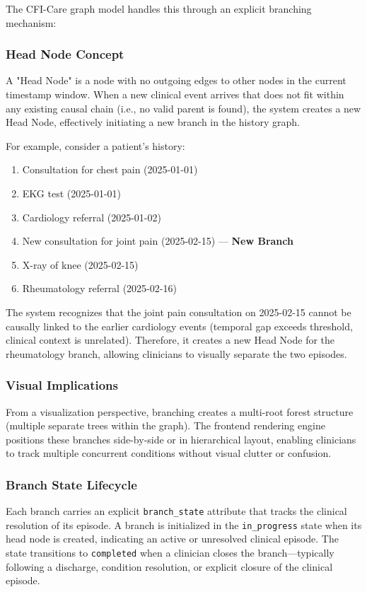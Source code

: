 The CFI-Care graph model handles this through an explicit branching mechanism:

\subsubsection{Head Node Concept}
A "Head Node" is a node with no outgoing edges to other nodes in the current
timestamp window. When a new clinical event arrives that does not fit within
any existing causal chain (i.e., no valid parent is found), the system creates
a new Head Node, effectively initiating a new branch in the history graph.

For example, consider a patient's history:
\begin{enumerate}
    \item Consultation for chest pain (2025-01-01)
    \item EKG test (2025-01-01)
    \item Cardiology referral (2025-01-02)
    \item New consultation for joint pain (2025-02-15) — \textbf{New Branch}
    \item X-ray of knee (2025-02-15)
    \item Rheumatology referral (2025-02-16)
\end{enumerate}

The system recognizes that the joint pain consultation on 2025-02-15 cannot be
causally linked to the earlier cardiology events (temporal gap exceeds
threshold, clinical context is unrelated). Therefore, it creates a new Head
Node for the rheumatology branch, allowing clinicians to visually separate the
two episodes.

\subsubsection{Visual Implications}
From a visualization perspective, branching creates a multi-root forest
structure (multiple separate trees within the graph). The frontend rendering
engine positions these branches side-by-side or in hierarchical layout,
enabling clinicians to track multiple concurrent conditions without visual
clutter or confusion.

\subsubsection{Branch State Lifecycle}
Each branch carries an explicit \texttt{branch\_state} attribute that tracks
the clinical resolution of its episode. A branch is initialized in the
\texttt{in\_progress} state when its head node is created, indicating an active
or unresolved clinical episode. The state transitions to \texttt{completed} when
a clinician closes the branch---typically following a discharge, condition
resolution, or explicit closure of the clinical episode.

